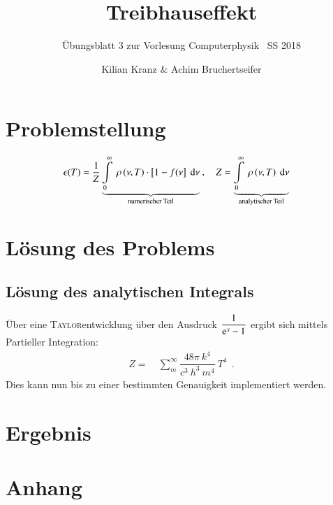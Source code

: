 \documentclass[12pt,a4paper,titlepage]{scrreprt}
\author{Kilian Kranz \& Achim Bruchertseifer}
\title{Treibhauseffekt}
\subtitle{Übungsblatt 3 zur Vorlesung \glqq Computerphysik\grqq~ SS 2018}
\begin{document}
	\maketitle
	\setcounter{chapter}{3}

	\section{Problemstellung}
	
	\begin{align}
	\epsilon(T)=&~\dfrac{1}{Z}\underbrace{\int\limits_0^\infty~\rho\left(\nu,T\right)\cdot\left[1-f(\nu\right]~\dif\nu}_{\text{numerischer Teil}}~,~~~~Z=\underbrace{\int\limits_0^\infty~\rho\left(\nu,T\right)~\dif\nu}_{\text{analytischer Teil}}
	\end{align}
	
	\section{Lösung des Problems}
	\subsection{Lösung des analytischen Integrals}
	Über eine \textsc{Taylor}entwicklung über den Ausdruck $\dfrac{1}{\mathrm{e}^x-1}$ ergibt sich mittels Partieller Integration:
	\begin{align}
		Z=&~\sum_{m}^{\infty}\dfrac{48\pi~k^4}{c^3~h^3~m^4}~T^4~~.
	\end{align}
	Dies kann nun bis zu einer bestimmten Genauigkeit implementiert werden.
	
	\section{Ergebnis}
	

	
	\section{Anhang}

	
\end{document}
